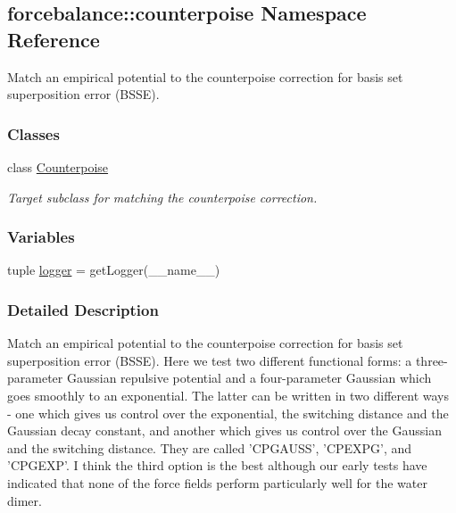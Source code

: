 \hypertarget{namespaceforcebalance_1_1counterpoise}{\subsection{forcebalance\-:\-:counterpoise \-Namespace \-Reference}
\label{namespaceforcebalance_1_1counterpoise}
}


\-Match an empirical potential to the counterpoise correction for basis set superposition error (\-B\-S\-S\-E).  


\subsubsection*{\-Classes}
\begin{DoxyCompactItemize}
\item 
class \hyperlink{classforcebalance_1_1counterpoise_1_1Counterpoise}{\-Counterpoise}
\begin{DoxyCompactList}\small\item\em \-Target subclass for matching the counterpoise correction. \end{DoxyCompactList}\end{DoxyCompactItemize}
\subsubsection*{\-Variables}
\begin{DoxyCompactItemize}
\item 
tuple \hyperlink{namespaceforcebalance_1_1counterpoise_a5a5391fb65604f4aeba9c2e39557b547}{logger} = get\-Logger(\-\_\-\-\_\-name\-\_\-\-\_\-)
\end{DoxyCompactItemize}


\subsubsection{\-Detailed \-Description}
\-Match an empirical potential to the counterpoise correction for basis set superposition error (\-B\-S\-S\-E). \-Here we test two different functional forms\-: a three-\/parameter \-Gaussian repulsive potential and a four-\/parameter \-Gaussian which goes smoothly to an exponential. \-The latter can be written in two different ways -\/ one which gives us control over the exponential, the switching distance and the \-Gaussian decay constant, and another which gives us control over the \-Gaussian and the switching distance. \-They are called '\-C\-P\-G\-A\-U\-S\-S', '\-C\-P\-E\-X\-P\-G', and '\-C\-P\-G\-E\-X\-P'. \-I think the third option is the best although our early tests have indicated that none of the force fields perform particularly well for the water dimer.

